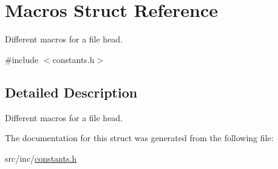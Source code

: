 \hypertarget{struct_macros}{}\section{Macros Struct Reference}
\label{struct_macros}


Different macros for a file head.  




{\ttfamily \#include $<$constants.\+h$>$}



\subsection{Detailed Description}
Different macros for a file head. 

The documentation for this struct was generated from the following file\+:\begin{DoxyCompactItemize}
\item 
src/inc/\mbox{\hyperlink{constants_8h}{constants.\+h}}\end{DoxyCompactItemize}
